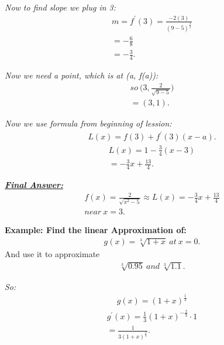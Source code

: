 \documentclass{report}
\begin{document}
    \bigbreak \noindent 
    \textit{Now to find slope we plug in 3:}
    \begin{align*}
      m = f^{\prime}(3) = \frac{-2(3)}{(9-5)^{\frac{3}{2}}}  \\
      = -\frac{6}{8} \\ 
      = -\frac{3}{4}
    .\end{align*}

    \bigbreak \noindent 
    \textit{Now we need a point, which is at (a, f(a)):}
    \begin{align*}
      so\ \bigg(3, \frac{2}{\sqrt{9-5}}\bigg) \\
      = (3,1)
    .\end{align*}

    \bigbreak \noindent 
    \textit{Now we use formula from beginning of lession:}
    \begin{align*}
      L(x) = f(3) + f^{\prime}(3)(x-a)
    .\end{align*}
    \begin{align*}
      L(x) = 1 - \frac{3}{4}(x-3) \\
      = -\frac{3}{4}x + \frac{13}{4}
    .\end{align*}

    \bigbreak \noindent 
    \textbf{\textit{\underline{Final Answer:}}}
    \begin{align*}
      f(x) = \frac{2}{\sqrt{x^{2} -5}} \approx L(x) = -\frac{3}{4}x + \frac{13}{4} \\ 
      near\ x = 3
    .\end{align*}

    \bigbreak \noindent 
    \begin{mdframed}
      \textbf{Example: Find the linear Approximation of:}
      \begin{align*}
        g(x) = \sqrt[3]{1+x}\ at\ x=0 
      .\end{align*}
      And use it to approximate
      \begin{align*}
        \sqrt[3]{0.95}\ and\ \sqrt[3]{1.1}
      .\end{align*}
    \end{mdframed}

    \bigbreak \noindent
    \textit{So:}
    \begin{align*}
      g(x) = (1+x)^{\frac{1}{3}}
    \end{align*}
    \begin{align*}
      g^{\prime}(x) = \frac{1}{3}(1+x)^{-\frac{2}{3}} \cdot 1 \\ 
      = \frac{1}{3(1+x)^{\frac{2}{3}}}
    .\end{align*}
\end{document}
